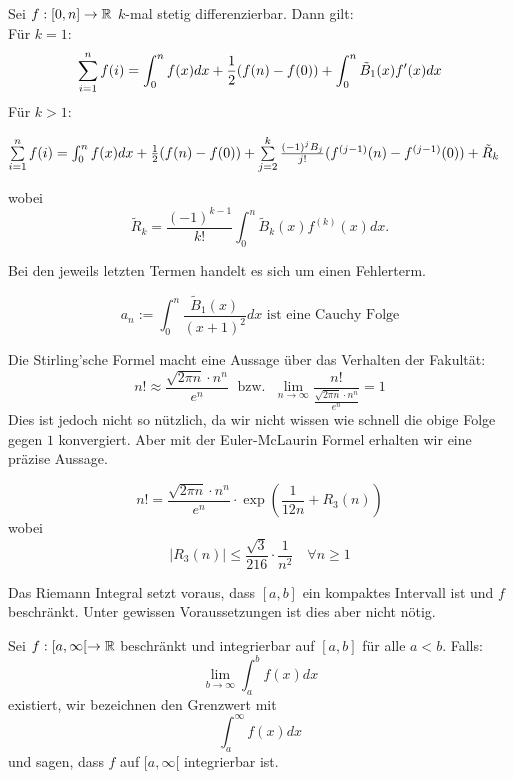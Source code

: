 \begin{tcolorbox}
    Sei $f : [0, n] \to \mathbb{R}$ $k$-mal stetig differenzierbar. Dann gilt: \\
    Für $k = 1$:        
    $$\sum\limits_{i = 1}^n f(i) = \int_0^n f(x)dx + \frac{1}{2}(f(n) - f(0)) + \int_0^n \tilde{B}_1(x)f'(x)dx$$
    Für $k > 1$: 
    \begin{center}
        $\sum\limits_{i = 1}^n f(i) = \int_0^n f(x)dx + \frac{1}{2}(f(n) - f(0)) + \sum\limits_{j = 2}^k \frac{(-1)^j B_j}{j!}(f^{(j-1)}(n) - f^{(j-1)}(0)) + \tilde{R}_k$
    \end{center}
    wobei
    $$\tilde{R}_k = \frac{(-1)^{k-1}}{k!} \int_0^n \tilde{B}_k(x)f^{(k)}(x)dx.$$
\end{tcolorbox}

Bei den jeweils letzten Termen handelt es sich um einen Fehlerterm.

$$a_n := \int_0^n \frac{\tilde{B}_1(x)}{(x+1)^2}dx \text{  ist eine Cauchy Folge}$$


Die Stirling'sche Formel macht eine Aussage über das Verhalten der Fakultät:
$$n! \approx \frac{\sqrt{2 \pi n} \cdot n^n}{e^n} \; \text{ bzw. } \; \lim_{n \to \infty} \frac{n!}{\frac{\sqrt{2 \pi n} \cdot n^n}{e^n}} = 1$$
Dies ist jedoch nicht so nützlich, da wir nicht wissen wie schnell die obige Folge gegen $1$ 
konvergiert. Aber mit der Euler-McLaurin Formel erhalten wir eine präzise Aussage.


\columnbreak


$$n! = \frac{\sqrt{2 \pi n} \cdot n^n}{e^n} \cdot \exp \left(\frac{1}{12n} + R_3(n)\right)$$
wobei
$$|R_3(n)| \leq \frac{\sqrt{3}}{216} \cdot \frac{1}{n^2} \quad \forall n \geq 1$$




Das Riemann Integral setzt voraus, dass $[a,b]$ ein kompaktes Intervall ist und $f$ beschränkt.
Unter gewissen Voraussetzungen ist dies aber nicht nötig.

\begin{tcolorbox}
    Sei $f : [a, \infty[ \to \mathbb{R}$ beschränkt und integrierbar auf $[a,b]$ für alle $a < b$. Falls:
    $$\lim_{b \to \infty} \int_a^b f(x)dx$$
    existiert, wir bezeichnen den Grenzwert mit
    $$\int_a^\infty f(x)dx$$
    und sagen, dass $f$ auf $[a, \infty[$ integrierbar ist.
\end{tcolorbox}

